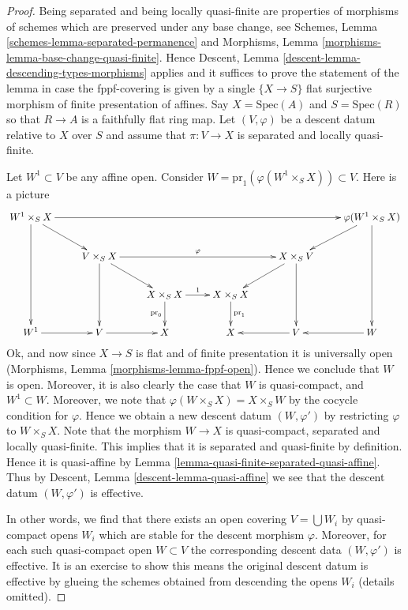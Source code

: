 \begin{proof}
Being separated and being locally quasi-finite
are properties of morphisms of schemes
which are preserved under any base change, see
Schemes, Lemma \ref{schemes-lemma-separated-permanence} and
Morphisms, Lemma \ref{morphisms-lemma-base-change-quasi-finite}.
Hence Descent, Lemma \ref{descent-lemma-descending-types-morphisms}
applies and it suffices to prove the statement of the lemma
in case the fppf-covering is given by a single
$\{X \to S\}$ flat surjective morphism of finite presentation of affines.
Say $X = \text{Spec}(A)$ and $S = \text{Spec}(R)$ so
that $R \to A$ is a faithfully flat ring map.
Let $(V, \varphi)$ be a descent datum relative to $X$ over $S$
and assume that $\pi : V \to X$ is separated and
locally quasi-finite.

\medskip\noindent
Let $W^1 \subset V$ be any affine open.
Consider $W = \text{pr}_1(\varphi(W^1 \times_S X)) \subset V$.
Here is a picture
$$
\xymatrix{
W^1 \times_S X \ar[rrrrr] \ar[ddd] \ar[rd]
& & & & &
\varphi(W^1 \times_S X) \ar[ddd] \ar[ld] \\
& V \times_S X \ar[rrr]^\varphi \ar[rd] \ar[dd]
& & &
X \times_S V \ar[ld] \ar[dd] & \\
& &
X \times_S X \ar[r]^1 \ar[d]_{\text{pr}_0}
&
X \times_S X \ar[d]^{\text{pr}_1}
& & \\
W^1 \ar[r] &
V \ar[r] &
X &
X &
V \ar[l] &
W \ar[l]
}
$$
Ok, and now since $X \to S$ is flat and of finite presentation it
is universally open (Morphisms, Lemma \ref{morphisms-lemma-fppf-open}).
Hence we conclude that $W$ is open. Moreover, it is
also clearly the case that $W$ is quasi-compact, and
$W^1 \subset W$. Moreover, we note that
$\varphi(W \times_S X) = X \times_S W$ by the cocycle
condition for $\varphi$. Hence we obtain a new descent datum
$(W, \varphi')$ by restricting $\varphi$ to $W \times_S X$.
Note that the morphism $W \to X$ is quasi-compact, separated
and locally quasi-finite. This implies that it is
separated and quasi-finite by definition. Hence it is quasi-affine by
Lemma \ref{lemma-quasi-finite-separated-quasi-affine}.
Thus by
Descent, Lemma \ref{descent-lemma-quasi-affine}
we see that the descent datum
$(W, \varphi')$ is effective.

\medskip\noindent
In other words, we find that there exists an open covering
$V = \bigcup W_i$ by quasi-compact opens $W_i$ which are
stable for the descent morphism $\varphi$.
Moreover, for each such quasi-compact open $W \subset V$
the corresponding descent data $(W, \varphi')$ is effective.
It is an exercise to show this means the
original descent datum is effective by glueing the
schemes obtained from descending the opens $W_i$ (details omitted).
\end{proof}


















